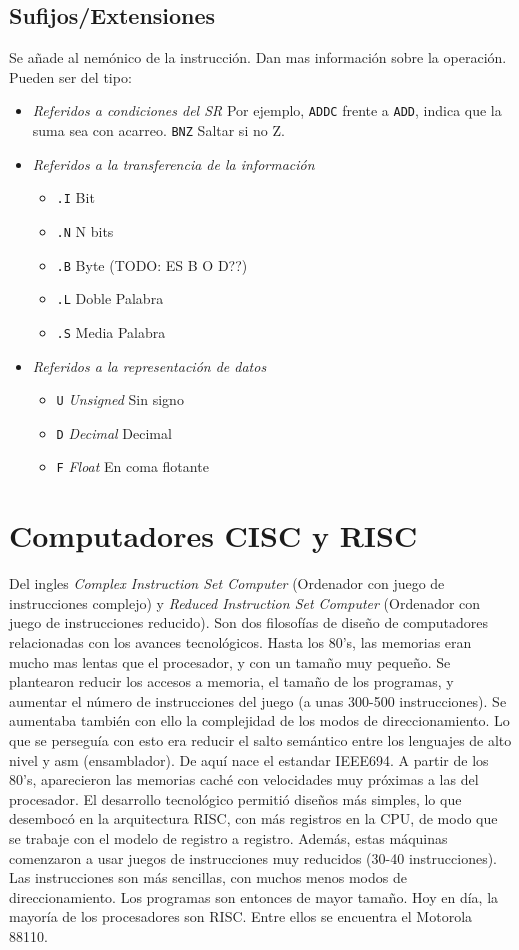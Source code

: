 \documentclass[a4paper,11pt,spanish]{report}
\begin{document}
\subsection{Sufijos/Extensiones}
Se añade al nemónico de la instrucción. Dan mas información sobre la operación. Pueden ser del tipo:
\begin{itemize}
\item \emph{Referidos a condiciones del SR} Por ejemplo, \verb|ADDC| frente a \verb|ADD|, indica que la suma sea con acarreo. \verb|BNZ| Saltar si no Z.
\item \emph{Referidos a la transferencia de la información}
\begin{itemize}
\item \verb|.I| \textrightarrow Bit
\item \verb|.N| \textrightarrow N bits
\item \verb|.B| \textrightarrow Byte  (TODO: ES B O D??)
\item \verb|.L| \textrightarrow Doble Palabra
\item \verb|.S| \textrightarrow Media Palabra
\end{itemize}
\item \emph{Referidos a la representación de datos}
\begin{itemize}
\item \verb|U| \textrightarrow \emph{Unsigned} Sin signo
\item \verb|D| \textrightarrow \emph{Decimal} Decimal
\item \verb|F| \textrightarrow \emph{Float} En coma flotante
\end{itemize}
\end{itemize}
\section{Computadores CISC y RISC}
Del ingles \emph{Complex Instruction Set Computer} (Ordenador con juego de instrucciones complejo) y \emph{Reduced Instruction Set Computer} (Ordenador con juego de instrucciones reducido).
Son dos filosofías de diseño de computadores relacionadas con los avances tecnológicos. Hasta los 80's, las memorias eran mucho mas lentas que el procesador, y con un tamaño muy pequeño. Se plantearon reducir los accesos a memoria, el tamaño de los programas, y aumentar el número de instrucciones del juego (a unas 300-500 instrucciones). 
Se aumentaba también con ello la complejidad de los modos de direccionamiento. Lo que se perseguía con esto era reducir el salto semántico entre los lenguajes de alto nivel y asm (ensamblador). De aquí nace el estandar IEEE694.
A partir de los 80's, aparecieron las memorias caché con velocidades muy próximas a las del procesador. El desarrollo tecnológico permitió diseños más simples, lo que desembocó en la arquitectura RISC, con más registros en la CPU, de modo que se trabaje con el modelo de registro a registro. Además, estas máquinas comenzaron a usar juegos de instrucciones muy reducidos (30-40 instrucciones). Las instrucciones son más sencillas, con muchos menos modos de direccionamiento. Los programas son entonces de mayor tamaño. Hoy en día, la mayoría de los procesadores son RISC. Entre ellos se encuentra el Motorola 88110.
\end{document}
